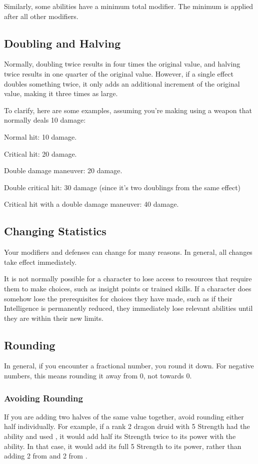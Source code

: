     Similarly, some abilities have a minimum total modifier.
    The minimum is applied after all other modifiers.

  \subsection{Doubling and Halving}\label{Doubling and Halving}
    Normally, doubling twice results in four times the original value, and halving twice results in one quarter of the original value.
    However, if a single effect doubles something twice, it only adds an additional increment of the original value, making it three times as large.

    To clarify, here are some examples, assuming you're making using a weapon that normally deals 10 damage:
    \begin{raggeditemize}
      \item Normal hit: 10 damage.
      \item Critical hit: 20 damage.
      \item Double damage maneuver: 20 damage.
      \item Double critical hit: 30 damage (since it's two doublings from the same effect)
      \item Critical hit with a double damage maneuver: 40 damage.
    \end{raggeditemize}

  \subsection{Changing Statistics}

    Your modifiers and defenses can change for many reasons.
    In general, all changes take effect immediately.

    It is not normally possible for a character to lose access to resources that require them to make choices, such as insight points or trained skills.
    If a character does somehow lose the prerequisites for choices they have made, such as if their Intelligence is permanently reduced, they immediately lose relevant abilities until they are within their new limits.

  \subsection{Rounding}
    In general, if you encounter a fractional number, you round it down.
    For negative numbers, this means rounding it away from 0, not towards 0.

    \subsubsection{Avoiding Rounding}
      If you are adding two halves of the same value together, avoid rounding either half individually.
      For example, if a rank 2 dragon druid with 5 Strength had the  ability and used , it would add half its Strength twice to its power with the ability.
      In that case, it would add its full 5 Strength to its power, rather than adding 2 from  and 2 from .
